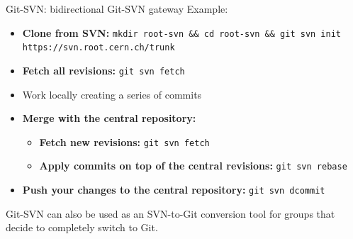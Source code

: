 \documentclass[final,hyperref={pdfpagelabels=false},notitlepage=true]{beamer}
\begin{document}
\begin{frame}{}
\begin{columns}[t]
\begin{column}{0.45\linewidth}
\begin{block}{\large Git-SVN: bidirectional Git-SVN gateway}
\vspace{1cm}
          Example:
          \begin{itemize}
            \item {\bf Clone from SVN:} {\tt mkdir root-svn \&\& cd root-svn \&\& git svn init https://svn.root.cern.ch/trunk}
            \item {\bf Fetch all revisions:} {\tt git svn fetch}
            \item Work locally creating a series of commits
            \item {\bf Merge with the central repository:}
              \begin{itemize}
                \item {\bf Fetch new revisions:} {\tt git svn fetch}
                \item {\bf Apply commits on top of the central revisions:} {\tt git svn rebase}
              \end{itemize}
            \item {\bf Push your changes to the central repository:} {\tt git svn dcommit}
          \end{itemize}

\vspace{1cm}
          Git-SVN can also be used as an SVN-to-Git conversion tool
          for groups that decide to completely switch to Git.
	\end{block}


\end{column}
\end{columns}
\end{frame}
\end{document}
